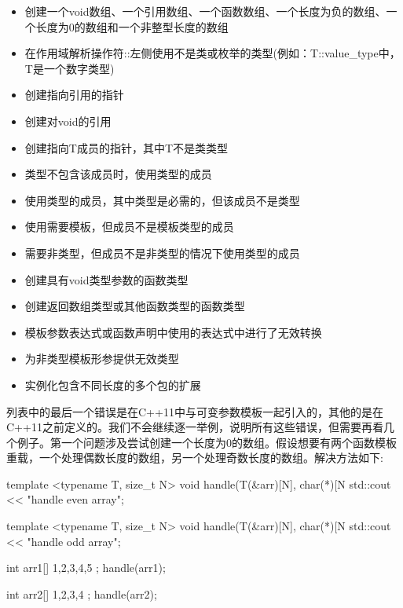 \begin{itemize}
\item
创建一个void数组、一个引用数组、一个函数数组、一个长度为负的数组、一个长度为0的数组和一个非整型长度的数组

\item
在作用域解析操作符::左侧使用不是类或枚举的类型(例如：T::value\_type中，T是一个数字类型)

\item
创建指向引用的指针

\item
创建对void的引用

\item
创建指向T成员的指针，其中T不是类类型

\item
类型不包含该成员时，使用类型的成员

\item
使用类型的成员，其中类型是必需的，但该成员不是类型

\item
使用需要模板，但成员不是模板类型的成员

\item
需要非类型，但成员不是非类型的情况下使用类型的成员

\item
创建具有void类型参数的函数类型

\item
创建返回数组类型或其他函数类型的函数类型

\item
模板参数表达式或函数声明中使用的表达式中进行了无效转换

\item
为非类型模板形参提供无效类型

\item
实例化包含不同长度的多个包的扩展
\end{itemize}

列表中的最后一个错误是在C++11中与可变参数模板一起引入的，其他的是在C++11之前定义的。我们不会继续逐一举例，说明所有这些错误，但需要再看几个例子。第一个问题涉及尝试创建一个长度为0的数组。假设想要有两个函数模板重载，一个处理偶数长度的数组，另一个处理奇数长度的数组。解决方法如下:

\begin{cpp}
template <typename T, size_t N>
void handle(T(&arr)[N], char(*)[N %
{
	std::cout << "handle even array\n";
}

template <typename T, size_t N>
void handle(T(&arr)[N], char(*)[N %
{
	std::cout << "handle odd array\n";
}

int arr1[]{ 1,2,3,4,5 };
handle(arr1);

int arr2[]{ 1,2,3,4 };
handle(arr2);
\end{cpp}

